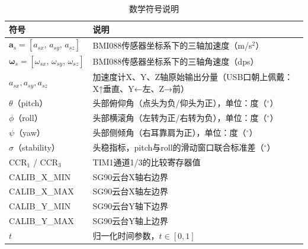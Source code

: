 \begin{table}[h!]
\centering
\caption{数学符号说明}
\label{tab:nomen_math}
\begin{tabular}{p{4cm} p{10.5cm}}
\toprule[1.5pt]
\textbf{符号} & \textbf{说明} \\
\hline
$\mathbf{a}_s  = [a_{sx},\, a_{sy},\, a_{sz}]$ & BMI088传感器坐标系下的三轴加速度（m/s$^2$） \\
$\boldsymbol{\omega}_s = [\omega_{sx},\, \omega_{sy},\, \omega_{sz}]$ & BMI088传感器坐标系下的三轴角速度（dps） \\
$a_{sx}, a_{sy}, a_{sz}$ & 加速度计X、Y、Z轴原始输出分量（USB口朝上佩戴：X↑垂直、Y←左、Z→前）\\
$\theta$（pitch） & 头部俯仰角（点头为负/仰头为正），单位：度（$^{\circ}$） \\
$\phi$（roll） & 头部横滚角（左转为正/右转为负），单位：度（$^{\circ}$） \\
$\psi$（yaw） & 头部侧倾角（右耳靠肩为正），单位：度（$^{\circ}$） \\
$\sigma$（stability） & 头稳指标，pitch与roll的滑动窗口联合标准差（$^{\circ}$） \\
CCR$_1$ / CCR$_3$ & TIM1通道1/3的比较寄存器值 \\
CALIB\_X\_MIN  & SG90云台X轴右边界 \\
CALIB\_X\_MAX  & SG90云台X轴左边界\\
CALIB\_Y\_MIN  & SG90云台Y轴下边界 \\
CALIB\_Y\_MAX  & SG90云台Y轴上边界 \\
$t$ & 归一化时间参数，$t\in[0,1]$ \\
\bottomrule[1.5pt]
\end{tabular}
\end{table}
\clearpage
